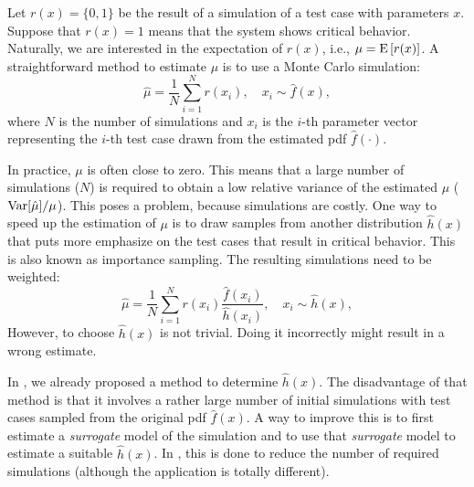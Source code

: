 \documentclass[10pt,final,a4paper,oneside,onecolumn]{article}
\newcommand{\expectation}[1]{\textup{E} \left[ #1 \right]}
\begin{document}
Let $r(x)=\{0,1\}$ be the result of a simulation of a test case with parameters $x$. Suppose that $r(x)=1$ means that the system shows critical behavior. Naturally, we are interested in the expectation of $r(x)$, i.e., $\mu =\expectation{r(x)}$. A straightforward method to estimate $\mu$ is to use a Monte Carlo simulation:
\begin{equation}
	\hat{\mu} = \frac{1}{N} \sum_{i=1}^N r(x_i), \quad x_i \sim \hat{f}(x),
\end{equation}
where $N$ is the number of simulations and $x_i$ is the $i$-th parameter vector representing the $i$-th test case drawn from the estimated pdf $\hat{f}(\cdot)$.

In practice, $\mu$ is often close to zero. This means that a large number of simulations ($N$) is required to obtain a low relative variance of the estimated $\mu$ ($\textup{Var}[\hat{\mu}]/\mu$). This poses a problem, because simulations are costly. One way to speed up the estimation of $\mu$ is to draw samples from another distribution $\hat{h}(x)$ that puts more emphasize on the test cases that result in critical behavior. This is also known as importance sampling. The resulting simulations need to be weighted:
\begin{equation}
	\hat{\mu} = \frac{1}{N} \sum_{i=1}^N r(x_i) \frac{\hat{f}(x_i)}{\hat{h}(x_i)}, \quad x_i \sim \hat{h}(x),
\end{equation}
However, to choose $\hat{h}(x)$ is not trivial. Doing it incorrectly might result in a wrong estimate.

In \autocite{deGelder2017assessment}, we already proposed a method to determine $\hat{h}(x)$. The disadvantage of that method is that it involves a rather large number of initial simulations with test cases sampled from the original pdf $\hat{f}(x)$. A way to improve this is to first estimate a \emph{surrogate} model of the simulation and to use that \emph{surrogate} model to estimate a suitable $\hat{h}(x)$. In \autocite{dubourg2013metamodel}, this is done to reduce the number of required simulations (although the application is totally different).


\printbibliography

%
\end{document}
